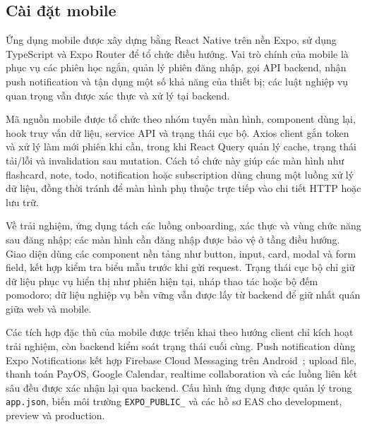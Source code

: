 \subsection{Cài đặt mobile}
\label{subsec:mobile-implementation}

Ứng dụng mobile được xây dựng bằng React Native trên nền Expo, sử dụng TypeScript và Expo Router để tổ chức điều hướng. Vai trò chính của mobile là phục vụ các phiên học ngắn, quản lý phiên đăng nhập, gọi API backend, nhận push notification và tận dụng một số khả năng của thiết bị; các luật nghiệp vụ quan trọng vẫn được xác thực và xử lý tại backend.

Mã nguồn mobile được tổ chức theo nhóm tuyến màn hình, component dùng lại, hook truy vấn dữ liệu, service API và trạng thái cục bộ. Axios client gắn token và xử lý làm mới phiên khi cần, trong khi React Query quản lý cache, trạng thái tải/lỗi và invalidation sau mutation. Cách tổ chức này giúp các màn hình như flashcard, note, todo, notification hoặc subscription dùng chung một luồng xử lý dữ liệu, đồng thời tránh để màn hình phụ thuộc trực tiếp vào chi tiết HTTP hoặc lưu trữ.

Về trải nghiệm, ứng dụng tách các luồng onboarding, xác thực và vùng chức năng sau đăng nhập; các màn hình cần đăng nhập được bảo vệ ở tầng điều hướng. Giao diện dùng các component nền tảng như button, input, card, modal và form field, kết hợp kiểm tra biểu mẫu trước khi gửi request. Trạng thái cục bộ chỉ giữ dữ liệu phục vụ hiển thị như phiên hiện tại, nháp thao tác hoặc bộ đếm pomodoro; dữ liệu nghiệp vụ bền vững vẫn được lấy từ backend để giữ nhất quán giữa web và mobile.

Các tích hợp đặc thù của mobile được triển khai theo hướng client chỉ kích hoạt trải nghiệm, còn backend kiểm soát trạng thái cuối cùng. Push notification dùng Expo Notifications kết hợp Firebase Cloud Messaging trên Android~\cite{firebasefcm}; upload file, thanh toán PayOS, Google Calendar, realtime collaboration và các luồng liên kết sâu đều được xác nhận lại qua backend. Cấu hình ứng dụng được quản lý trong \texttt{app.json}, biến môi trường \texttt{EXPO\_PUBLIC\_} và các hồ sơ EAS cho development, preview và production.
